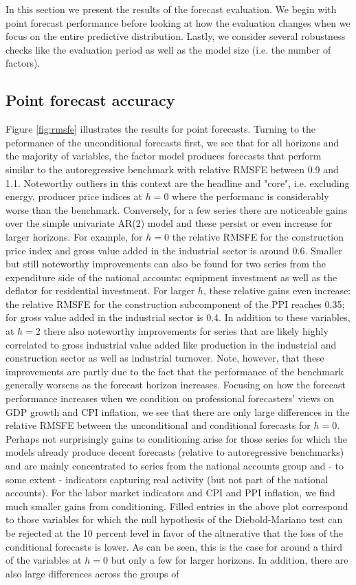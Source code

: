 \documentclass[notitlepage,a4paper,12pt]{article}
\begin{document}
In this section we present the results of the forecast evaluation. We begin with point forecast performance before looking at how the evaluation changes when we focus on the entire predictive distribution. Lastly, we consider several robustness checks like the evaluation period as well as the model size (i.e. the number of factors). 

\subsection{Point forecast accuracy}

Figure \ref{fig:rmsfe} illustrates the results for point forecasts. Turning to the peformance of the unconditional forecasts first, we see that for all horizons and the majority of variables, the factor model produces forecasts that perform similar to the autoregressive benchmark with relative RMSFE between 0.9 and 1.1. Noteworthy outliers in this context are the headline and "core", i.e. excluding energy, producer price indices at $h=0$ where the performanc is considerably worse than the benchmark. Conversely, for a few series there are noticeable gains over the simple univariate AR(2) model and these persist or even increase for larger horizons. For example, for $h=0$ the relative RMSFE for the construction price index and gross value added in the industrial sector is around 0.6. Smaller but still noteworthy improvements can also be found for two series from the expenditure side of the national accounts: equipment investment as well as the deflator for residential investment. For larger $h$, these relative gains even increase: the relative RMSFE for the construction subcomponent of the PPI reaches 0.35; for gross value added in the industrial sector is 0.4. In addition to these variables, at $h=2$ there also noteworthy improvements for series that are likely highly correlated to gross industrial value added like production in the industrial and construction sector as well as industrial turnover. Note, however, that these improvements are partly due to the fact that the performance of the benchmark generally worsens as the forecast horizon increases. Focusing on how the forecast performance increases when we condition on professional forecasters' views on GDP growth and CPI inflation, we see that there are only large differences in the relative RMSFE between the unconditional and conditional forecasts for $h=0$. Perhaps not surprisingly gains to conditioning arise for those series for which the models already produce decent forecasts (relative to autoregressive benchmarks) and are mainly concentrated to series from the national accounts group and - to some extent - indicators capturing real activity (but not part of the national accounts). For the labor market indicators and CPI and PPI inflation, we find much smaller gains from conditioning. Filled entries in the above plot correspond to those variables for which the null hypothesis of the Diebold-Mariano test can be rejected at the 10 percent level in favor of the altnerative that the loss of the conditional forecasts is lower. As can  be seen, this is the case for around a third of the variables at $h=0$ but only a few for larger horizons. In addition, there are also large differences across the groups of 
\end{document}
